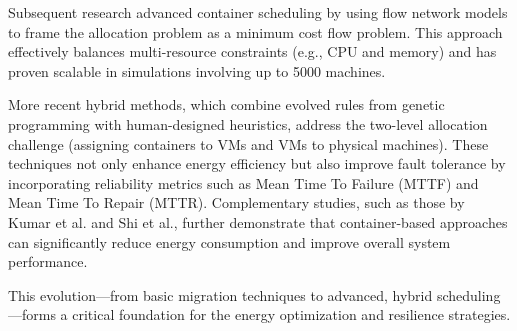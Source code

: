 \begin{multicols}{2}
Subsequent research advanced container scheduling by using flow network models to frame the allocation problem as a minimum cost flow problem. This approach effectively balances multi-resource constraints (e.g., CPU and memory) and has proven scalable in simulations involving up to 5000 machines\cite{hu_concurrent_2020}. 

More recent hybrid methods, which combine evolved rules from genetic programming with human-designed heuristics, address the two-level allocation challenge (assigning containers to VMs and VMs to physical machines). These techniques not only enhance energy efficiency but also improve fault tolerance by incorporating reliability metrics such as Mean Time To Failure (MTTF) and Mean Time To Repair (MTTR)\cite{tan_hybrid_2019, alahmad_availability-aware_2018}. Complementary studies, such as those by Kumar et al.\cite{kumar_renewable_2019} and Shi et al.\cite{shi_energy-aware_2018}, further demonstrate that container-based approaches can significantly reduce energy consumption and improve overall system performance.

This evolution—from basic migration techniques to advanced, hybrid scheduling—forms a critical foundation for the energy optimization and resilience strategies.


\end{multicols}


